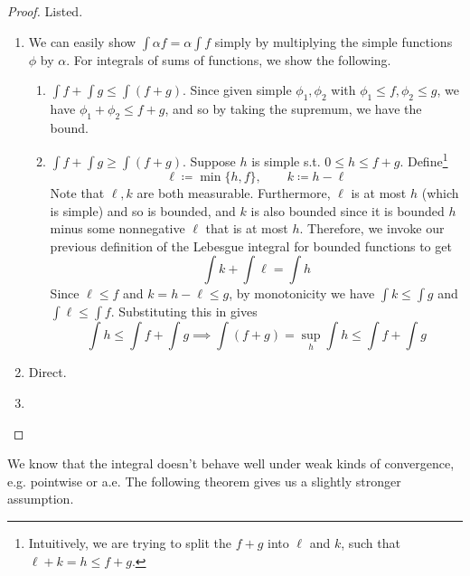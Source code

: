   \begin{proof}
    Listed. 
    \begin{enumerate}
      \item We can easily show $\int \alpha f = \alpha \int f$ simply by multiplying the simple functions $\phi$ by $\alpha$. For integrals of sums of functions, we show the following. 
      \begin{enumerate}
        \item $\int f + \int g \leq \int (f + g)$. Since given simple $\phi_1, \phi_2$ with $\phi_1 \leq f, \phi_2 \leq g$, we have $\phi_1 + \phi_2 \leq f + g$, and so by taking the supremum, we have the bound. 

        \item $\int f + \int g \geq \int (f + g)$. Suppose $h$ is simple s.t. $0 \leq h \leq f + g$. Define\footnote{Intuitively, we are trying to split the $f + g$ into $\ell$ and $k$, such that $\ell + k = h \leq f + g$.} 
          \begin{equation}
            \ell \coloneqq \min\{h, f\}, \qquad k \coloneqq h - \ell
          \end{equation}
          Note that $\ell, k$ are both measurable. Furthermore, $\ell$ is at most $h$ (which is simple) and so is bounded, and $k$ is also bounded since it is bounded $h$ minus some nonnegative $\ell$ that is at most $h$. Therefore, we invoke our previous definition of the Lebesgue integral for bounded functions to get 
          \begin{equation}
            \int k + \int \ell = \int h
          \end{equation}
          Since $\ell \leq f$ and $k = h - \ell \leq g$, by monotonicity we have $\int k \leq \int g$ and $\int \ell \leq \int f$. Substituting this in gives 
          \begin{equation}
            \int h \leq \int f + \int g \implies \int (f + g) = \sup_h \int h \leq \int f + \int g
          \end{equation}
        \end{enumerate}
      \item Direct. 
      \item 
    \end{enumerate}
  \end{proof}

  We know that the integral doesn't behave well under weak kinds of convergence, e.g. pointwise or a.e. The following theorem gives us a slightly stronger assumption. 

